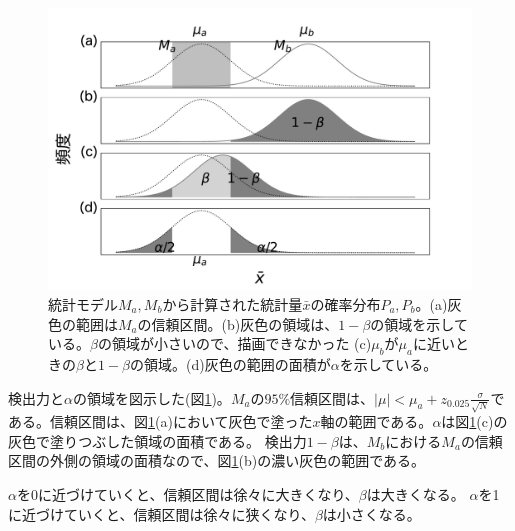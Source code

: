 \begin{figure}
\begin{center}
    \includegraphics[width=15cm]{./image/04_/power_of_a_test_2.pdf}
    \caption{統計モデル$M_a,M_b$から計算された統計量$\bar{x}$の確率分布$P_a,P_b$。(a)灰色の範囲は$M_a$の信頼区間。(b)灰色の領域は、$1-\beta$の領域を示している。$\beta$の領域が小さいので、描画できなかった (c)$\mu_b$が$\mu_a$に近いときの$\beta$と$1-\beta$の領域。(d)灰色の範囲の面積が$\alpha$を示している。}
    \label{fig:power_of_test_alpha_beta}
\end{center}
\end{figure}


検出力と$\alpha$の領域を図示した(図\ref{fig:power_of_test_alpha_beta})。$M_a$の$95\%$信頼区間は、$|\mu|<\mu_a+z_{0.025}\frac{\sigma}{\sqrt{N}}$である。信頼区間は、図\ref{fig:power_of_test_alpha_beta}(a)において灰色で塗った$x$軸の範囲である。$\alpha$は図\ref{fig:power_of_test_alpha_beta}(c)の灰色で塗りつぶした領域の面積である。
検出力$1-\beta$は、$M_b$における$M_a$の信頼区間の外側の領域の面積なので、図\ref{fig:power_of_test_alpha_beta}(b)の濃い灰色の範囲である。

$\alpha$を0に近づけていくと、信頼区間は徐々に大きくなり、$\beta$は大きくなる。
$\alpha$を1に近づけていくと、信頼区間は徐々に狭くなり、$\beta$は小さくなる。



